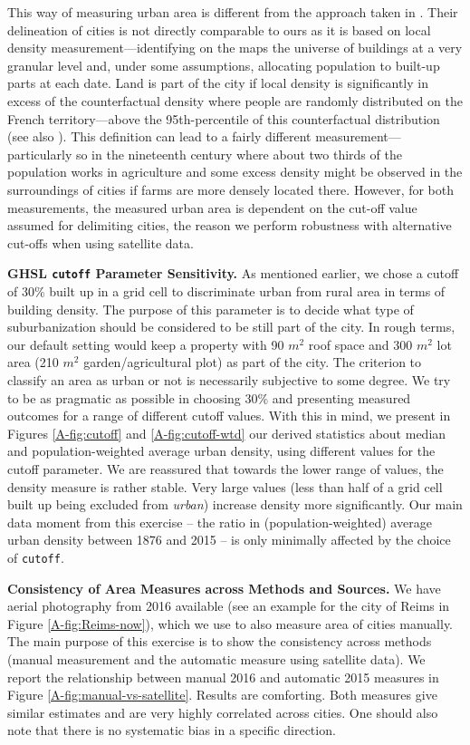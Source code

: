 \documentclass[11pt]{report}
\begin{document}
This way of measuring urban area is different from the approach taken in \cite{combesetal2021}. Their delineation of cities is not directly comparable to ours as it is based on local density measurement---identifying on the maps the universe of buildings at a very granular level and, under some assumptions, allocating population to built-up parts at each date. Land is part of the city if local density is significantly in excess of the counterfactual density where people are randomly distributed on the French territory---above the 95th-percentile of this counterfactual distribution (see also \cite{delineating-JUE}). This definition can lead to a fairly different measurement---particularly so in the nineteenth century where about two thirds of the population works in agriculture and some excess density might be observed in the surroundings of cities if farms are more densely located there. However, for both measurements, the measured urban area is dependent on the cut-off value assumed for delimiting cities, the reason we perform robustness with alternative cut-offs when using satellite data.


\textbf{GHSL \texttt{cutoff} Parameter Sensitivity.}\label{A-sec:cutoff-sens} As mentioned earlier, we chose a cutoff of 30\% built up in a grid cell to discriminate urban from rural area in terms of building density. The purpose of this parameter is to decide what type of suburbanization should be considered to be still part of the city. In rough terms, our default setting would keep a property with 90 $m^2$ roof space and 300 $m^2$ lot area (210 $m^2$ garden/agricultural plot) as part of the city. The criterion to classify an area as urban or not is necessarily subjective to some degree. We try to be as pragmatic as possible in choosing 30\% and presenting measured outcomes for a range of different cutoff values. With this in mind, we present in Figures \ref{A-fig:cutoff} and \ref{A-fig:cutoff-wtd} our derived statistics about median and population-weighted average urban density, using different values for the cutoff parameter. We are reassured that towards the lower range of values, the density measure is rather stable. Very large values (less than half of a grid cell built up being excluded from \emph{urban}) increase density more significantly. Our main data moment from this exercise -- the ratio in (population-weighted) average urban density between 1876 and 2015 -- is only minimally affected by the choice of \texttt{cutoff}.

\textbf{Consistency of Area Measures across Methods and Sources.} We have aerial photography from 2016 available (see an example for the city of Reims in Figure \ref{A-fig:Reims-now}), which we use to also measure area of cities manually. The main purpose of this exercise is to show the consistency across methods (manual measurement and the automatic measure using satellite data). We report the relationship between manual 2016 and automatic 2015 measures in Figure \ref{A-fig:manual-vs-satellite}. Results are comforting. Both measures give similar estimates and are very highly correlated across cities. One should also note that there is no systematic bias in a specific direction.
\end{document}
